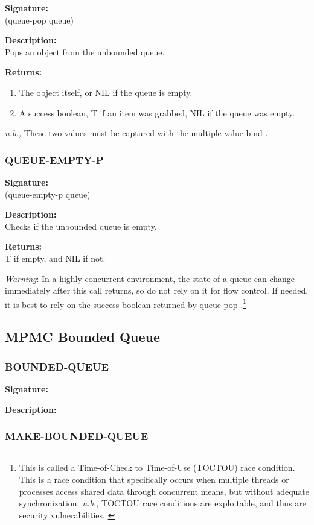 \documentclass[12pt, letterpaper]{article}
\DeclareRobustCommand{\code}[1]{%
	\begingroup
	\setlength{\fboxsep}{2pt}%
	\colorbox{gray!15}{\ttfamily\small #1}%
	\endgroup
}
\newcommand{\customitem}[2]{%
	\noindent\textbf{#1}\\[0.5ex]%
	#2\vspace{1ex}%
}
\begin{document}
	\customitem{Signature:}{\code{(queue-pop queue)}}
	
	\customitem{Description:}{Pops an object from the unbounded queue.}
	
	\customitem{Returns:}{}
	\begin{enumerate}
		\item The \code{object} itself, or \code{NIL} if the queue is empty.
		\item A success boolean, \code{T} if an item was grabbed, \code{NIL} if the queue was empty.
	\end{enumerate}
	\textit{n.b.,} These two values must be captured with the \code{multiple-value-bind}.
	\subsubsection{QUEUE-EMPTY-P}
	
	\customitem{Signature:}{\code{(queue-empty-p queue)}}
	
	\customitem{Description:}{Checks if the unbounded queue is empty.}
	
	\customitem{Returns:}{\code{T} if empty, and \code{NIL} if not.}
	
	\textit{Warning}: In a highly concurrent environment, the state of a queue can change immediately after this call returns, so do not rely on it for flow control. If needed, it is best to rely on the success boolean returned by \code{queue-pop}.\footnote{This is called a Time-of-Check to Time-of-Use (TOCTOU) race condition. This is a race condition that specifically occurs when multiple threads or processes access shared data through concurrent means, but without adequate synchronization. \textit{n.b.,} TOCTOU race conditions are exploitable, and thus are security vulnerabilities. \cite{cwe367}}
	
	\subsection{MPMC Bounded Queue}
	\subsubsection{BOUNDED-QUEUE}
	
	\customitem{Signature:}{}
	
	\customitem{Description:}{}
	\subsubsection{MAKE-BOUNDED-QUEUE}
	
\end{document}
